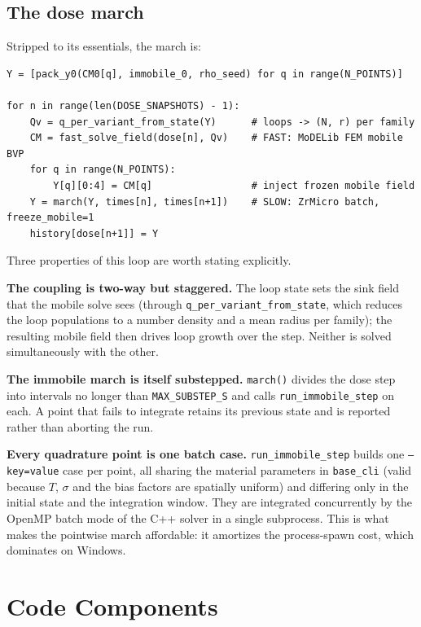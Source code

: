 \documentclass[11pt]{article}
\newcommand{\code}[1]{\texttt{\small #1}}
\begin{document}
\subsection{The dose march}

Stripped to its essentials, the march is:

\begin{lstlisting}
Y = [pack_y0(CM0[q], immobile_0, rho_seed) for q in range(N_POINTS)]

for n in range(len(DOSE_SNAPSHOTS) - 1):
    Qv = q_per_variant_from_state(Y)      # loops -> (N, r) per family
    CM = fast_solve_field(dose[n], Qv)    # FAST: MoDELib FEM mobile BVP
    for q in range(N_POINTS):
        Y[q][0:4] = CM[q]                 # inject frozen mobile field
    Y = march(Y, times[n], times[n+1])    # SLOW: ZrMicro batch, freeze_mobile=1
    history[dose[n+1]] = Y
\end{lstlisting}

Three properties of this loop are worth stating explicitly.

\textbf{The coupling is two-way but staggered.} The loop state sets the sink
field that the mobile solve sees (through \code{q\_per\_variant\_from\_state},
which reduces the loop populations to a number density and a mean radius per
family); the resulting mobile field then drives loop growth over the step. Neither
is solved simultaneously with the other.

\textbf{The immobile march is itself substepped.} \code{march()} divides the dose
step into intervals no longer than \code{MAX\_SUBSTEP\_S} and calls
\code{run\_immobile\_step} on each. A point that fails to integrate retains its
previous state and is reported rather than aborting the run.

\textbf{Every quadrature point is one batch case.} \code{run\_immobile\_step}
builds one \code{--key=value} case per point, all sharing the material parameters
in \code{base\_cli} (valid because $T$, $\sigma$ and the bias factors are
spatially uniform) and differing only in the initial state and the integration
window. They are integrated concurrently by the OpenMP batch mode of the C++
solver in a single subprocess. This is what makes the pointwise march affordable:
it amortizes the process-spawn cost, which dominates on Windows.

\section{Code Components}
\label{sec:components}
\end{document}
